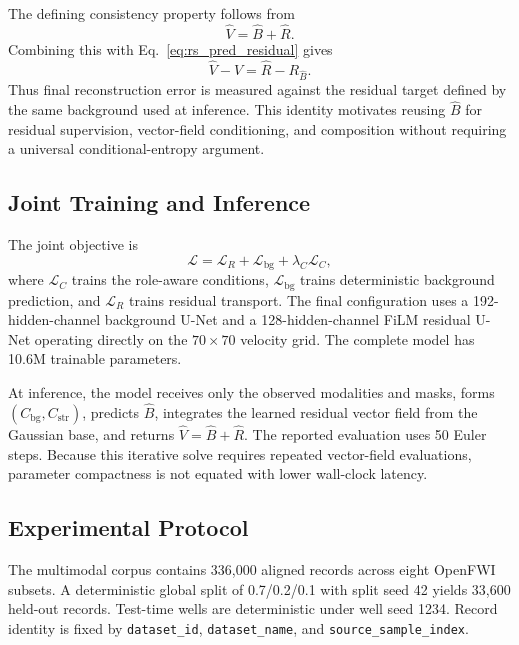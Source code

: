\documentclass[remotesensing,article,submit,pdftex,moreauthors]{Definitions/mdpi}
\begin{document}
The defining consistency property follows from
\begin{equation}
\hat V=\hat B+\hat R.
\end{equation}
Combining this with Eq.~\eqref{eq:rs_pred_residual} gives
\begin{equation}
\hat V-V=\hat R-R_{\hat B}.
\label{eq:rs_composition_identity}
\end{equation}
Thus final reconstruction error is measured against the residual target defined by the same background used at inference. This identity motivates reusing $\hat B$ for residual supervision, vector-field conditioning, and composition without requiring a universal conditional-entropy argument.

\subsection{Joint Training and Inference}

The joint objective is
\begin{equation}
\mathcal L=
\mathcal L_R+\mathcal L_{\mathrm{bg}}+\lambda_C\mathcal L_C,
\end{equation}
where $\mathcal L_C$ trains the role-aware conditions, $\mathcal L_{\mathrm{bg}}$ trains deterministic background prediction, and $\mathcal L_R$ trains residual transport. The final configuration uses a 192-hidden-channel background U-Net and a 128-hidden-channel FiLM \citep{perez2018film} residual U-Net operating directly on the $70\times70$ velocity grid. The complete model has 10.6M trainable parameters.

At inference, the model receives only the observed modalities and masks, forms $(C_{\mathrm{bg}},C_{\mathrm{str}})$, predicts $\hat B$, integrates the learned residual vector field from the Gaussian base, and returns $\hat V=\hat B+\hat R$. The reported evaluation uses 50 Euler steps. Because this iterative solve requires repeated vector-field evaluations, parameter compactness is not equated with lower wall-clock latency.

\subsection{Experimental Protocol}

The multimodal corpus contains 336,000 aligned records across eight OpenFWI subsets. A deterministic global split of 0.7/0.2/0.1 with split seed 42 yields 33,600 held-out records. Test-time wells are deterministic under well seed 1234. Record identity is fixed by \texttt{dataset\_id}, \texttt{dataset\_name}, and \texttt{source\_sample\_index}.
\end{document}
